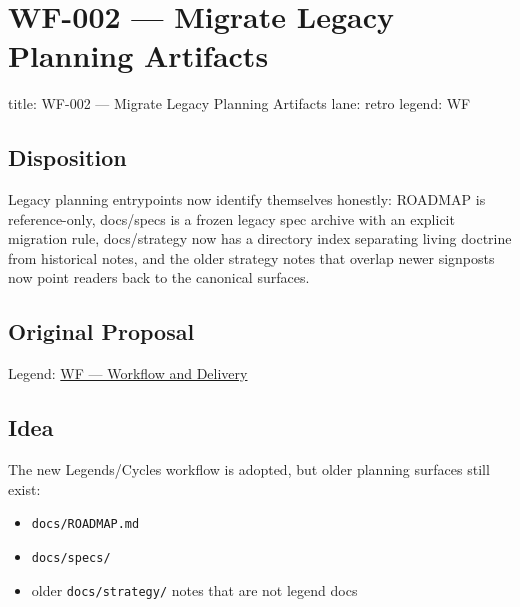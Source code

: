 \chapter{WF-002 --- Migrate Legacy Planning Artifacts}\label{record-408}

\smallskip

\begin{RecordMeta}
title: WF-002 — Migrate Legacy Planning Artifacts
lane: retro
legend: WF

\end{RecordMeta}

\section{Disposition}\label{record-408-disposition}

Legacy planning entrypoints now identify themselves honestly: ROADMAP is reference-only, docs/specs is a frozen legacy spec archive with an explicit migration rule, docs/strategy now has a directory index separating living doctrine from historical notes, and the older strategy notes that overlap newer signposts now point readers back to the canonical surfaces.

\section{Original Proposal}\label{record-408-original-proposal}

Legend: \href{https://github.com/flyingrobots/bijou/blob/1853ad902f6bf219326409e7f743a5a1d6517dbc/docs/method/legends/WF-workflow-and-delivery.md}{WF --- Workflow and Delivery}

\section{Idea}\label{record-408-idea}

The new Legends/Cycles workflow is adopted, but older planning surfaces still exist:

\begin{itemize}
\tightlist
\item
  \texttt{d\allowbreak{}o\allowbreak{}c\allowbreak{}s\allowbreak{}/\allowbreak{}R\allowbreak{}O\allowbreak{}A\allowbreak{}D\allowbreak{}M\allowbreak{}A\allowbreak{}P\allowbreak{}.\allowbreak{}m\allowbreak{}d}
\item
  \texttt{d\allowbreak{}o\allowbreak{}c\allowbreak{}s\allowbreak{}/\allowbreak{}s\allowbreak{}p\allowbreak{}e\allowbreak{}c\allowbreak{}s\allowbreak{}/}
\item
  older \texttt{d\allowbreak{}o\allowbreak{}c\allowbreak{}s\allowbreak{}/\allowbreak{}s\allowbreak{}t\allowbreak{}r\allowbreak{}a\allowbreak{}t\allowbreak{}e\allowbreak{}g\allowbreak{}y\allowbreak{}/} notes that are not legend docs
\end{itemize}

